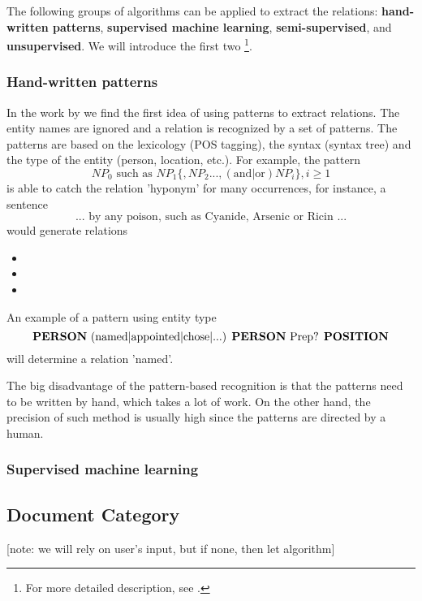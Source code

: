 \documentclass[
  digital, %
  table,   %
  lof,     %
  lot,     %
]{fithesis3}
\begin{document}
The following groups of algorithms can be applied to extract the relations: \textbf{hand-written patterns}, \textbf{supervised machine learning}, \textbf{semi-supervised}, and \textbf{unsupervised}.
We will introduce the first two
\footnote{For more detailed description, see  \cite{jurafsky2014speech}.}.

\subsubsection{\textbf{Hand-written patterns}}
In the work  by \citeauthor{hearst1992automatic} \cite{hearst1992automatic} we find the first idea of using patterns to extract relations.
The entity names are ignored and a relation is recognized by a set of patterns.
The patterns are based on the lexicology (POS tagging), the syntax (syntax tree) and the type of the entity (person, location, etc.).
For example, the pattern \cite[sec. 21.2]{jurafsky2014speech}
$$
NP_0\text{ such as }NP_1 \{, NP_2 ..., (\text{and|or})NP_i \}, i \geq 1
$$
is able to catch the relation 'hyponym' for many occurrences, for instance, a sentence
$$
\text{... by any poison, such as Cyanide, Arsenic or Ricin ...}
$$
would generate relations 
\begin{itemize}
\item <poison, hyponym of, Cyanide>
\item <poison, hyponym of, Arsenic>
\item <poison, hyponym of, Ricin>
\end{itemize}
An example of a pattern using entity type \cite[sec. 21.2]{jurafsky2014speech}
$$
\text{\textbf{PERSON} (named|appointed|chose|...) \textbf{PERSON} Prep? \textbf{POSITION}}
$$
will determine a relation 'named'. 

The big disadvantage of the pattern-based recognition is that the patterns need to be written by hand, which takes a lot of work. On the other hand, the precision of such method is usually high since the patterns are directed by a human.

\subsubsection{\textbf{Supervised machine learning}}



\subsection{Document Category}
[note: we will rely on user's input, but if none, then let algorithm]
\end{document}
